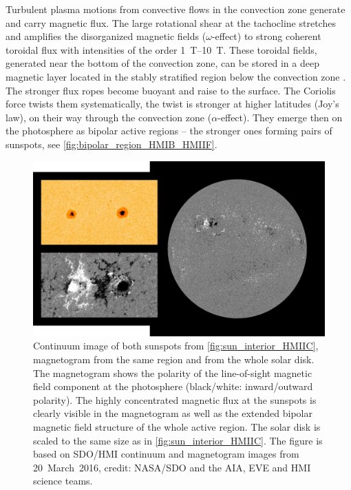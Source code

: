 
Turbulent plasma motions from convective flows in the convection zone generate and carry magnetic flux. The large rotational shear at the tachocline stretches and amplifies the disorganized magnetic fields ($\omega$-effect) to strong coherent toroidal flux with intensities of the order \SIrange{1}{10}{\tesla}. These toroidal fields, generated near the bottom of the convection zone, can be stored in a deep magnetic layer located in the stably stratified region below the convection zone \citep{Ossendrijver2003}. The stronger flux ropes become buoyant and raise to the surface. The Coriolis force twists them systematically, the twist is stronger at higher latitudes (Joy's law), on their way through the convection zone ($\alpha$-effect). They emerge then on the photosphere as bipolar active regions -- the stronger ones forming pairs of sunspots, see \autoref{fig:bipolar_region_HMIB_HMIIF}.
\begin{figure}[htb]
	\centering
	\includegraphics[width=\textwidth]{images/own_figures/bipolar_region_HMIB_HMIIF.png}
	\caption{Continuum image of both sunspots from \autoref{fig:sun_interior_HMIIC}, magnetogram from the same region and from the whole solar disk. The magnetogram shows the polarity of the line-of-sight magnetic field component at the photosphere (black/white: inward/outward polarity). The highly concentrated magnetic flux at the sunspots is clearly visible in the magnetogram as well as the extended bipolar magnetic field structure of the whole active region. The solar disk is scaled to the same size as in \autoref{fig:sun_interior_HMIIC}. The figure is based on SDO/HMI continuum and magnetogram images from 20~March~2016, credit: NASA/SDO and the AIA, EVE and HMI science teams.}
	\label{fig:bipolar_region_HMIB_HMIIF}
\end{figure}
